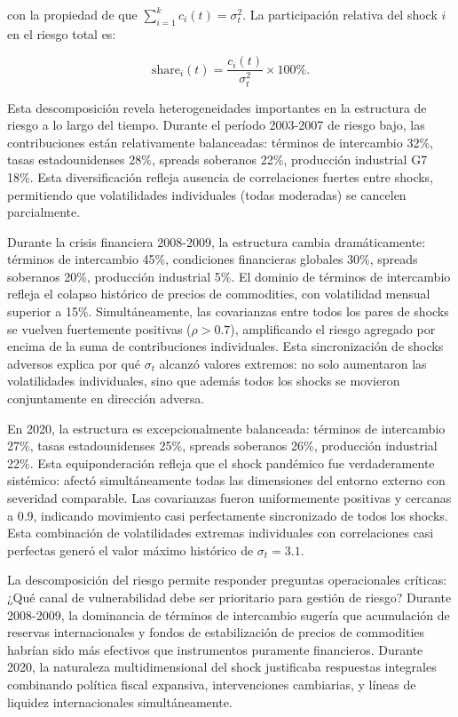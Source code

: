 \documentclass[3p,11pt,draft,natbib=false]{elsarticle}
\begin{document}
con la propiedad de que $\sum_{i=1}^{k} c_i(t) = \sigma_t^2$. La participación relativa del shock $i$ en el riesgo total es:

\begin{equation}
\text{share}_i(t) = \frac{c_i(t)}{\sigma_t^2} \times 100\%.
\label{eq:risk_share}
\end{equation}

Esta descomposición revela heterogeneidades importantes en la estructura de riesgo a lo largo del tiempo. Durante el período 2003-2007 de riesgo bajo, las contribuciones están relativamente balanceadas: términos de intercambio 32\%, tasas estadounidenses 28\%, spreads soberanos 22\%, producción industrial G7 18\%. Esta diversificación refleja ausencia de correlaciones fuertes entre shocks, permitiendo que volatilidades individuales (todas moderadas) se cancelen parcialmente.

Durante la crisis financiera 2008-2009, la estructura cambia dramáticamente: términos de intercambio 45\%, condiciones financieras globales 30\%, spreads soberanos 20\%, producción industrial 5\%. El dominio de términos de intercambio refleja el colapso histórico de precios de commodities, con volatilidad mensual superior a 15\%. Simultáneamente, las covarianzas entre todos los pares de shocks se vuelven fuertemente positivas ($\rho > 0.7$), amplificando el riesgo agregado por encima de la suma de contribuciones individuales. Esta sincronización de shocks adversos explica por qué $\sigma_t$ alcanzó valores extremos: no solo aumentaron las volatilidades individuales, sino que además todos los shocks se movieron conjuntamente en dirección adversa.

En 2020, la estructura es excepcionalmente balanceada: términos de intercambio 27\%, tasas estadounidenses 25\%, spreads soberanos 26\%, producción industrial 22\%. Esta equiponderación refleja que el shock pandémico fue verdaderamente sistémico: afectó simultáneamente todas las dimensiones del entorno externo con severidad comparable. Las covarianzas fueron uniformemente positivas y cercanas a 0.9, indicando movimiento casi perfectamente sincronizado de todos los shocks. Esta combinación de volatilidades extremas individuales con correlaciones casi perfectas generó el valor máximo histórico de $\sigma_t = 3.1$.

La descomposición del riesgo permite responder preguntas operacionales críticas: ¿Qué canal de vulnerabilidad debe ser prioritario para gestión de riesgo? Durante 2008-2009, la dominancia de términos de intercambio sugería que acumulación de reservas internacionales y fondos de estabilización de precios de commodities habrían sido más efectivos que instrumentos puramente financieros. Durante 2020, la naturaleza multidimensional del shock justificaba respuestas integrales combinando política fiscal expansiva, intervenciones cambiarias, y líneas de liquidez internacionales simultáneamente.
\end{document}
